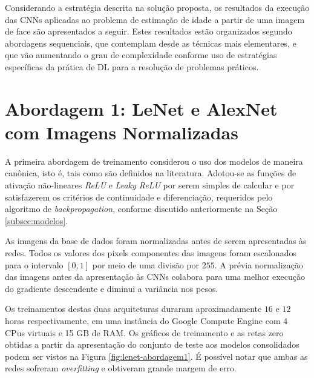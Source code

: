 
Considerando a estratégia descrita na solução proposta, os resultados da execução das CNNs aplicadas ao problema de estimação de idade a partir de uma imagem de face são apresentados a seguir. Estes resultados estão organizados segundo abordagens sequenciais, que contemplam desde as técnicas mais elementares, e que vão aumentando o grau de complexidade conforme uso de estratégias específicas da prática de DL para a resolução de problemas práticos.

\section{Abordagem 1: LeNet e AlexNet com Imagens Normalizadas}%

	A primeira abordagem de treinamento considerou o uso dos modelos de maneira canônica, isto é, tais como são definidos na literatura. Adotou-se as funções de ativação não-lineares \emph{ReLU} e \emph{Leaky ReLU} por serem simples de calcular e por satisfazerem os critérios de continuidade e diferenciação, requeridos pelo algoritmo de \emph{backpropagation}, conforme discutido anteriormente na Seção \ref{subsec:modelos}.

	As imagens da base de dados foram normalizadas antes de serem apresentadas às redes. Todos os valores dos pixels componentes das imagens foram escalonados para o intervalo $[0,1]$ por meio de uma divisão por $255$. A prévia normalização das imagens antes da apresentação às CNNs colabora para uma melhor execução do gradiente descendente e diminui a variância nos pesos.

	Os treinamentos destas duas arquiteturas duraram aproximadamente $16$ e $12$ horas respectivamente, em uma instância do Google Compute Engine com 4 CPus virtuais e 15 GB de RAM. Os gráficos de treinamento e as retas zero obtidas a partir da apresentação do conjunto de teste aos modelos consolidados podem ser vistos na Figura \ref{fig:lenet-abordagem1}. É possível notar que ambas as redes sofreram \emph{overfitting} e obtiveram grande margem de erro.


